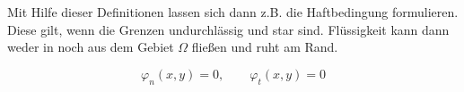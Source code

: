 		Mit Hilfe dieser Definitionen lassen sich dann z.B. die Haftbedingung formulieren.
		Diese gilt, wenn die Grenzen undurchlässig und star sind. 
		Flüssigkeit kann dann weder in noch aus dem Gebiet $\Omega$ fließen und ruht am Rand.
			
		\[ \varphi_n (x, y) = 0, \qquad \varphi_t (x, y) = 0 \]
		



